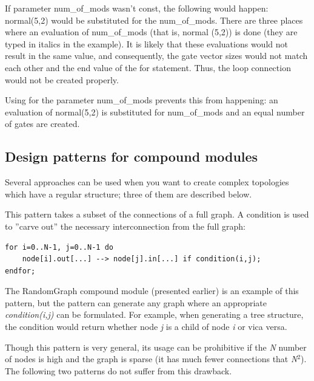 If parameter num\_of\_mods wasn't const, the following would happen:\\
normal(5,2) would be substituted for the num\_of\_mods. There
are three places where an evaluation of num\_of\_mods (that is, normal
(5,2)) is done (they are typed in italics in the example). It
is likely that these evaluations would not result in the same
value, and consequently, the gate vector sizes would not match
each other and the end value of the for statement. Thus, the
loop connection would not be created properly.

Using  for the parameter num\_of\_mods
prevents this from happening: an evaluation of normal(5,2) is
substituted for num\_of\_mods and an equal number of gates are
created.





\subsection{Design patterns for compound modules}


Several approaches can be used when you want to create complex
topologies which have a regular structure; three of them are
described below.




This pattern takes a subset of the connections of a full graph.  A
condition is used to ''carve out'' the necessary interconnection from
the full graph:


\begin{Verbatim}[commandchars=\\\{\}]
for i=0..N-1, j=0..N-1 do
    node[i].out[...] --> node[j].in[...] if condition(i,j);
endfor;
\end{Verbatim}




The RandomGraph compound module (presented earlier) is an example of
this pattern, but the pattern can generate any graph where an
appropriate \textit{condition(i,j)} can be formulated. For example,
when generating a tree structure, the condition
would return whether node \textit{j} is a child of node \textit{i} or
vica versa.

Though this pattern is very general, its usage can be prohibitive if
the \textit{N} number of nodes is high and the graph is sparse (it has
much fewer connections that \textit{N}$^{\mathit{2}}$). The following
two patterns do not suffer from this drawback.



